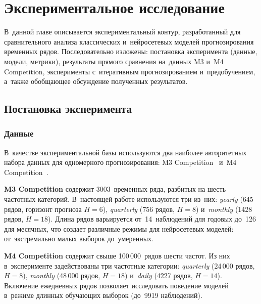 
\newpage
\section{Экспериментальное исследование}
\label{sec:experiments}

В~данной главе описывается экспериментальный контур, разработанный для
сравнительного анализа классических и~нейросетевых моделей прогнозирования
временных рядов. Последовательно изложены: постановка эксперимента
(данные, модели, метрики), результаты прямого сравнения на~данных M3 и~M4
Competition, эксперименты с~итеративным прогнозированием и~предобучением,
а~также обобщающее обсуждение полученных результатов.

\subsection{Постановка эксперимента}
\label{subsec:setup}

\subsubsection{Данные}
\label{sssec:data}

В~качестве экспериментальной базы используются два наиболее авторитетных
набора данных для одномерного прогнозирования: M3 Competition~\cite{makridakis2000m3}
и~M4 Competition~\cite{makridakis2020m4}.

\textbf{M3 Competition} содержит 3003~временных ряда,
разбитых на шесть частотных категорий. В~настоящей работе используются
три из~них: \textit{yearly} (645 рядов, горизонт прогноза $H{=}6$),
\textit{quarterly} (756 рядов, $H{=}8$) и~\textit{monthly}
(1428 рядов, $H{=}18$). Длина рядов варьируется от~14~наблюдений
для годовых до~126 для месячных, что создает различные режимы для
нейросетевых моделей: от~экстремально малых выборок до~умеренных.

\textbf{M4 Competition} содержит свыше 100\,000~рядов шести частот.
Из них в~эксперименте задействованы три частотные категории:
\textit{quarterly} (24\,000 рядов, $H{=}8$), \textit{monthly}
(48\,000 рядов, $H{=}18$) и~\textit{daily} (4227 рядов, $H{=}14$).
Включение ежедневных рядов позволяет исследовать поведение моделей
в~режиме длинных обучающих выборок (до~9919 наблюдений).

